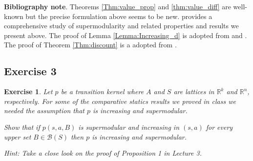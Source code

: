 \documentclass[letter,11pt]{article}
\newtheorem{exercise}{Exercise}[section]
\begin{document}
\textbf{Bibliography note}. Theorems \ref{Thm:value_prop} and \ref{thm:value_diff} are well-known but the precise formulation above seems to be new. 
\cite{topkis1998supermodularity} provides a comprehensive study of supermodularity and related properties and results we present above. The proof of Lemma \ref{Lemma:Increasing_d} is adopted from \cite{lovejoy1987ordered} and \cite{hopenhayn1992}. The proof of Theorem \ref{Thm:discount} is a adopted from \cite{light2021stochastic}. 


\subsection{Exercise 3}

\begin{exercise}
    Let $p$ be a transition kernel where $A$ and $S$ are lattices in $\mathbb{R}^{k}$ and $\mathbb{R}^{n}$, respectively.  For some of the comparative statics results we proved in class we needed the assumption that $p$ is increasing  and supermodular.
    
    Show that if $p(s,a,B)$ is supermodular and increasing in $(s,a)$ for every upper set $B \in \mathcal{B}(S)$  then $p$ is increasing and  supermodular. 

    Hint: Take a close look on the proof of Proposition 1 in Lecture 3.
\end{exercise}
\end{document}
